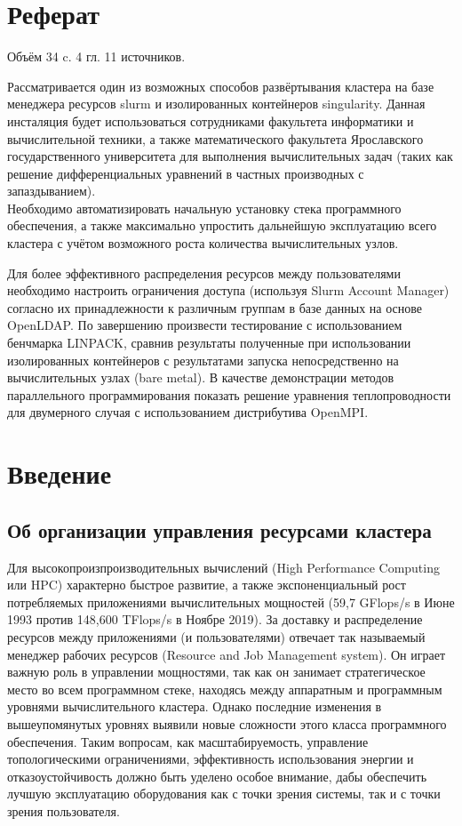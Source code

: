 \documentclass[a4paper]{extarticle}
\begin{document}
\section*{Реферат}

Объём 34 c. 4 гл. 11 источников.

Рассматривается один из возможных способов развёртывания кластера на базе менеджера ресурсов slurm и изолированных контейнеров singularity. Данная инсталяция будет использоваться сотрудниками факультета информатики и вычислительной техники, а также математического факультета Ярославского государственного университета для выполнения вычислительных задач (таких как решение  дифференциальных уравнений в частных производных с запаздыванием).  \\ Необходимо автоматизировать начальную установку стека программного обеспечения, а также максимально упростить дальнейшую эксплуатацию всего кластера с учётом возможного роста количества
вычислительных узлов. 

Для более эффективного распределения ресурсов между пользователями необходимо настроить ограничения доступа (используя Slurm Account Manager) согласно их принадлежности к различным группам в базе данных на основе OpenLDAP. По завершению произвести тестирование с использованием бенчмарка LINPACK, сравнив результаты полученные при использовании изолированных контейнеров с результатами запуска непосредственно на вычислительных узлах (bare metal). В качестве демонстрации методов параллельного программирования показать решение уравнения теплопроводности для двумерного случая с использованием дистрибутива OpenMPI.

\clearpage

\section*{Введение}

\subsection*{Об организации управления ресурсами кластера}

Для высокопроизпроизводительных вычислений (High Performance Computing или HPC) характерно быстрое развитие, а также экспоненциальный рост потребляемых приложениями вычислительных мощностей (59,7 GFlops/s в Июне 1993 против 148,600 TFlops/s в Ноябре 2019\cite{top500}). За доставку и распределение ресурсов между приложениями (и пользователями) отвечает так называемый менеджер рабочих ресурсов (Resource and Job Management system).  Он играет важную роль в управлении мощностями, так как он занимает стратегическое место во всем программном стеке, находясь между аппаратным
и программным уровнями вычислительного кластера. Однако последние изменения в вышеупомянутых уровнях выявили новые сложности этого класса программного обеспечения. Таким вопросам, как масштабируемость, управление топологическими ограничениями, эффективность использования энергии и отказоустойчивость должно быть уделено особое внимание, дабы обеспечить лучшую эксплуатацию оборудования как с точки зрения системы, так и с точки зрения пользователя.
\end{document}
